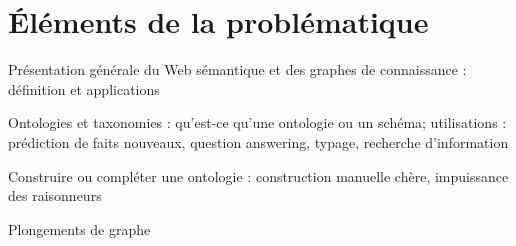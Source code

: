 \label{sec:Introduction}  %



\clearpage

\section{Éléments de la problématique}  %




Présentation générale du Web sémantique et des graphes de connaissance : définition et applications

Ontologies et taxonomies : qu'est-ce qu'une ontologie ou un schéma; utilisations : prédiction de faits nouveaux, question answering, typage, recherche d'information

Construire ou compléter une ontologie : construction manuelle chère, impuissance des raisonneurs

Plongements de graphe







